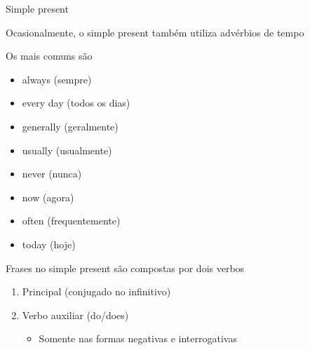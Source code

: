 \documentclass[compress,mathserif,xcolor=table]{beamer}
\begin{document}
\begin{frame}{Simple present}

Ocasionalmente, o simple present também utiliza advérbios de tempo

Os mais comuns são

\begin{minipage}{.49\textwidth}
\begin{itemize}
    \item always (sempre)
    \item every day (todos os dias)
    \item generally (geralmente)
    \item usually (usualmente)
\end{itemize}
\end{minipage}
\begin{minipage}{.49\textwidth}
\begin{itemize}
    \item never (nunca) 
    \item now (agora)
    \item often (frequentemente)
    \item today (hoje)
\end{itemize}
\end{minipage}

\vspace{0.5cm}

Frases no simple present são compostas por dois verbos
\begin{enumerate}
    \item Principal (conjugado no infinitivo)
    \item Verbo auxiliar (do/does)
    \begin{itemize}
        \item Somente nas formas negativas e interrogativas
    \end{itemize}
\end{enumerate}

\end{frame}

\end{document}
